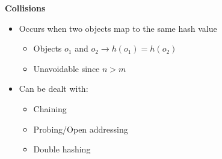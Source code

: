 \documentclass[10pt, 
a4paper, 
oneside, 
headinclude, footinclude, 
BCOR5mm]
{scrartcl}
\begin{document}
\textbf{Collisions}
\begin{itemize}
    \item Occurs when two objects map to the same hash value
    \begin{itemize}
        \item Objects $o_1$ and $o_2\rightarrow h(o_1)=h(o_2)$
        \item Unavoidable since $n>m$
    \end{itemize}
    \item Can be dealt with:
    \begin{itemize}
        \item Chaining
        \item Probing/Open addressing
        \item Double hashing
    \end{itemize}
\end{itemize}
\end{document}
